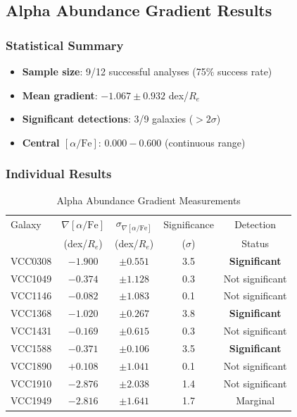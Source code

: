 \documentclass[12pt,a4paper]{article}
\newcommand{\alphaFe}{[\alpha/\text{Fe}]}
\begin{document}
\subsection{Alpha Abundance Gradient Results}

\subsubsection{Statistical Summary}
\begin{itemize}
    \item \textbf{Sample size}: 9/12 successful analyses (75\% success rate)
    \item \textbf{Mean gradient}: $-1.067 \pm 0.932$ dex/$R_e$
    \item \textbf{Significant detections}: 3/9 galaxies ($>2\sigma$)
    \item \textbf{Central $\alphaFe$}: $0.000-0.600$ (continuous range)
\end{itemize}

\subsubsection{Individual Results}
\begin{table}[H]
\centering
\caption{Alpha Abundance Gradient Measurements}
\begin{tabular}{lcccc}
\toprule
Galaxy & $\nabla\alphaFe$ & $\sigma_{\nabla\alphaFe}$ & Significance & Detection \\
       & (dex/$R_e$)      & (dex/$R_e$)              & ($\sigma$)   & Status    \\
\midrule
VCC0308 & $-1.900$ & $\pm 0.551$ & 3.5 & \textbf{Significant} \\
VCC1049 & $-0.374$ & $\pm 1.128$ & 0.3 & Not significant \\
VCC1146 & $-0.082$ & $\pm 1.083$ & 0.1 & Not significant \\
VCC1368 & $-1.020$ & $\pm 0.267$ & 3.8 & \textbf{Significant} \\
VCC1431 & $-0.169$ & $\pm 0.615$ & 0.3 & Not significant \\
VCC1588 & $-0.371$ & $\pm 0.106$ & 3.5 & \textbf{Significant} \\
VCC1890 & $+0.108$ & $\pm 1.041$ & 0.1 & Not significant \\
VCC1910 & $-2.876$ & $\pm 2.038$ & 1.4 & Not significant \\
VCC1949 & $-2.816$ & $\pm 1.641$ & 1.7 & Marginal \\
\bottomrule
\end{tabular}
\end{table}
\end{document}
